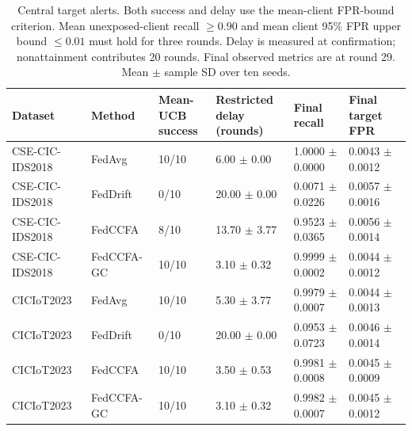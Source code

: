 \begin{table}[t]
\centering
\small
\setlength{\tabcolsep}{3pt}
\caption{Central target alerts. Both success and delay use the mean-client FPR-bound criterion. Mean unexposed-client recall $\geq0.90$ and mean client 95\% FPR upper bound $\leq0.01$ must hold for three rounds. Delay is measured at confirmation; nonattainment contributes 20 rounds. Final observed metrics are at round 29. Mean $\pm$ sample SD over ten seeds.}
\label{tab:central_target_alert_main}
\begin{tabular}{llllll}
\hline
Dataset & Method & \shortstack{Mean-UCB\\success} & \shortstack{Restricted delay\\(rounds)} & Final recall & Final target FPR \\
\hline
CSE-CIC-IDS2018 & FedAvg & 10/10 & 6.00 $\pm$ 0.00 & 1.0000 $\pm$ 0.0000 & 0.0043 $\pm$ 0.0012 \\
CSE-CIC-IDS2018 & FedDrift & 0/10 & 20.00 $\pm$ 0.00 & 0.0071 $\pm$ 0.0226 & 0.0057 $\pm$ 0.0016 \\
CSE-CIC-IDS2018 & FedCCFA & 8/10 & 13.70 $\pm$ 3.77 & 0.9523 $\pm$ 0.0365 & 0.0056 $\pm$ 0.0014 \\
CSE-CIC-IDS2018 & FedCCFA-GC & 10/10 & 3.10 $\pm$ 0.32 & 0.9999 $\pm$ 0.0002 & 0.0044 $\pm$ 0.0012 \\
CICIoT2023 & FedAvg & 10/10 & 5.30 $\pm$ 3.77 & 0.9979 $\pm$ 0.0007 & 0.0044 $\pm$ 0.0013 \\
CICIoT2023 & FedDrift & 0/10 & 20.00 $\pm$ 0.00 & 0.0953 $\pm$ 0.0723 & 0.0046 $\pm$ 0.0014 \\
CICIoT2023 & FedCCFA & 10/10 & 3.50 $\pm$ 0.53 & 0.9981 $\pm$ 0.0008 & 0.0045 $\pm$ 0.0009 \\
CICIoT2023 & FedCCFA-GC & 10/10 & 3.10 $\pm$ 0.32 & 0.9982 $\pm$ 0.0007 & 0.0045 $\pm$ 0.0012 \\
\hline
\end{tabular}
\end{table}

